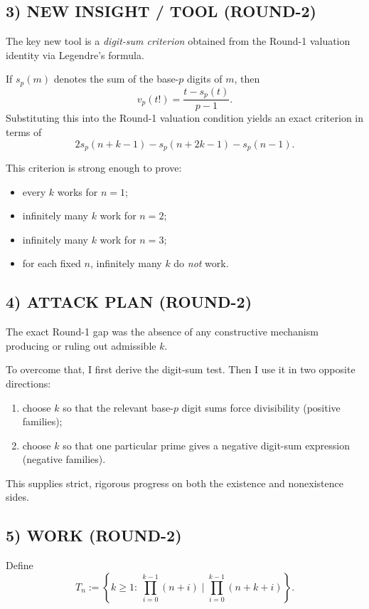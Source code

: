 \subsection*{3) NEW INSIGHT / TOOL (ROUND-2)}

The key new tool is a \emph{digit-sum criterion} obtained from the Round-1 valuation identity via Legendre's formula.

If $s_p(m)$ denotes the sum of the base-$p$ digits of $m$, then
\[
v_p(t!)=\frac{t-s_p(t)}{p-1}.
\]
Substituting this into the Round-1 valuation condition yields an exact criterion in terms of
\[
2s_p(n+k-1)-s_p(n+2k-1)-s_p(n-1).
\]

This criterion is strong enough to prove:
\begin{itemize}
\item every $k$ works for $n=1$;
\item infinitely many $k$ work for $n=2$;
\item infinitely many $k$ work for $n=3$;
\item for each fixed $n$, infinitely many $k$ do \emph{not} work.
\end{itemize}

\subsection*{4) ATTACK PLAN (ROUND-2)}

The exact Round-1 gap was the absence of any constructive mechanism producing or ruling out admissible $k$.

To overcome that, I first derive the digit-sum test.  Then I use it in two opposite directions:

\begin{enumerate}
\item choose $k$ so that the relevant base-$p$ digit sums force divisibility (positive families);
\item choose $k$ so that one particular prime gives a negative digit-sum expression (negative families).
\end{enumerate}

This supplies strict, rigorous progress on both the existence and nonexistence sides.

\subsection*{5) WORK (ROUND-2)}

Define
\[
T_n:=\left\{k\ge 1:\ \prod_{i=0}^{k-1}(n+i)\mid \prod_{i=0}^{k-1}(n+k+i)\right\}.
\]

